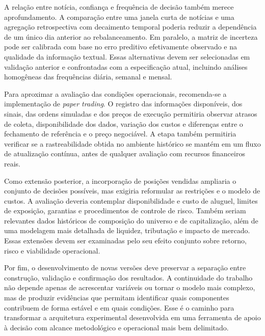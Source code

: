 A relação entre notícia, confiança e frequência de decisão também merece aprofundamento. A comparação entre uma janela curta de notícias e uma agregação retrospectiva com decaimento temporal poderia reduzir a dependência de um único dia anterior ao rebalanceamento. Em paralelo, a matriz de incerteza pode ser calibrada com base no erro preditivo efetivamente observado e na qualidade da informação textual. Essas alternativas devem ser selecionadas em validação anterior e confrontadas com a especificação atual, incluindo análises homogêneas das frequências diária, semanal e mensal.

Para aproximar a avaliação das condições operacionais, recomenda-se a implementação de \emph{paper trading}. O registro das informações disponíveis, dos sinais, das ordens simuladas e dos preços de execução permitiria observar atrasos de coleta, disponibilidade dos dados, variação dos custos e diferenças entre o fechamento de referência e o preço negociável. A etapa também permitiria verificar se a rastreabilidade obtida no ambiente histórico se mantém em um fluxo de atualização contínua, antes de qualquer avaliação com recursos financeiros reais.

Como extensão posterior, a incorporação de posições vendidas ampliaria o conjunto de decisões possíveis, mas exigiria reformular as restrições e o modelo de custos. A avaliação deveria contemplar disponibilidade e custo de aluguel, limites de exposição, garantias e procedimentos de controle de risco. Também seriam relevantes dados históricos de composição do universo e de capitalização, além de uma modelagem mais detalhada de liquidez, tributação e impacto de mercado. Essas extensões devem ser examinadas pelo seu efeito conjunto sobre retorno, risco e viabilidade operacional.

Por fim, o desenvolvimento de novas versões deve preservar a separação entre construção, validação e confirmação dos resultados. A continuidade do trabalho não depende apenas de acrescentar variáveis ou tornar o modelo mais complexo, mas de produzir evidências que permitam identificar quais componentes contribuem de forma estável e em quais condições. Esse é o caminho para transformar a arquitetura experimental desenvolvida em uma ferramenta de apoio à decisão com alcance metodológico e operacional mais bem delimitado.

